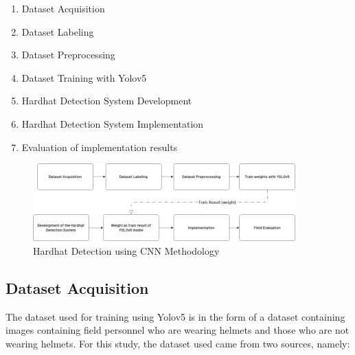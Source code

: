 \begin{enumerate}[nolistsep]  
  \item Dataset Acquisition
  \item Dataset Labeling 
  \item Dataset Preprocessing  
  \item Dataset Training with Yolov5  
  \item Hardhat Detection System Development
  \item Hardhat Detection System  Implementation 
  \item Evaluation of implementation results 
\end{enumerate}

\begin{figure} [ht]
  \centering
  \includegraphics[width=0.9\textwidth]{gambar/utilities/methodologi_hardhat.png}

  \caption{Hardhat Detection using CNN Methodology}
  \label{fig:hedec_method}
\end{figure}

\subsection{Dataset Acquisition}
\label{subsec:DatasetAcquisition}

\par The dataset used for training using Yolov5 is in the form of a dataset containing images containing field personnel who are wearing helmets and those who are not wearing helmets. For this study, the dataset used came from two sources, namely:

